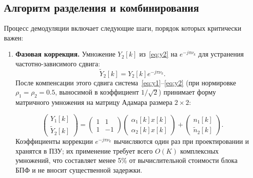 \documentclass[a4paper,12pt]{article}
\numberwithin{equation}{section}
\begin{document}
\subsection{Алгоритм разделения и комбинирования}
Процесс демодуляции включает следующие шаги, порядок которых критически важен:

\begin{enumerate}
    \item \textbf{Фазовая коррекция.} Умножение $Y_2[k]$ из~\eqref{eq:y2} на $e^{-j \pi \nu_k}$ для устранения частотно-зависимого сдвига:
    \begin{equation}
    \tilde{Y}_2[k] = Y_2[k] e^{-j \pi \nu_k}.
    \end{equation}
    После компенсации этого сдвига система~\eqref{eq:y1}--\eqref{eq:y2} (при нормировке $\rho_1=\rho_2=0.5$, выносимой в коэффициент $1/\sqrt{2}$) принимает форму матричного умножения на матрицу Адамара размера $2\times2$:

    \begin{equation}
    \begin{pmatrix} Y_1[k] \\ \tilde{Y}_2[k] \end{pmatrix} = 
    \begin{pmatrix} 1 & 1 \\ 1 & -1 \end{pmatrix} 
    \begin{pmatrix} \alpha_1[k] x[k] \\ \alpha_2[k] x[k] \end{pmatrix} + 
    \begin{pmatrix} n_1[k] \\ \tilde{n}_2[k] \end{pmatrix}.
    \end{equation}
    Коэффициенты коррекции $e^{-j \pi \nu_k}$ вычисляются один раз при проектировании и хранятся в ПЗУ; их применение требует всего $O(K)$ комплексных умножений, что составляет менее 5\% от вычислительной стоимости блока БПФ и не вносит существенной задержки.
    

\end{enumerate}
\end{document}
